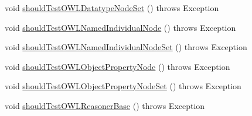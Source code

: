 \begin{DoxyCompactItemize}
\item 
void \hyperlink{classorg_1_1semanticweb_1_1owlapi_1_1contract_1_1_contract_reasoner_impl_test_a0ce2674d52e6ebbf091cbbe3a54f4f69}{should\-Test\-O\-W\-L\-Datatype\-Node\-Set} ()  throws Exception 
\item 
void \hyperlink{classorg_1_1semanticweb_1_1owlapi_1_1contract_1_1_contract_reasoner_impl_test_ae352b09596c32d875d6175c40a2599e7}{should\-Test\-O\-W\-L\-Named\-Individual\-Node} ()  throws Exception 
\item 
void \hyperlink{classorg_1_1semanticweb_1_1owlapi_1_1contract_1_1_contract_reasoner_impl_test_a87a9e4d51f4d5cb807da9ca89c59bbd1}{should\-Test\-O\-W\-L\-Named\-Individual\-Node\-Set} ()  throws Exception 
\item 
void \hyperlink{classorg_1_1semanticweb_1_1owlapi_1_1contract_1_1_contract_reasoner_impl_test_a0ade06317d6645433f83b7468ee227af}{should\-Test\-O\-W\-L\-Object\-Property\-Node} ()  throws Exception 
\item 
void \hyperlink{classorg_1_1semanticweb_1_1owlapi_1_1contract_1_1_contract_reasoner_impl_test_ad562aae76bd68ad968d2120c01f4c460}{should\-Test\-O\-W\-L\-Object\-Property\-Node\-Set} ()  throws Exception 
\item 
void \hyperlink{classorg_1_1semanticweb_1_1owlapi_1_1contract_1_1_contract_reasoner_impl_test_aeb46e7b97244761574536edf119b5c74}{should\-Test\-O\-W\-L\-Reasoner\-Base} ()  throws Exception 
\end{DoxyCompactItemize}



